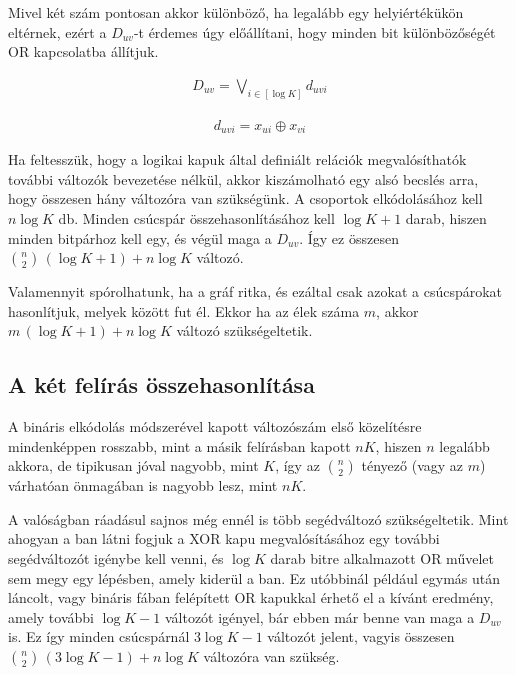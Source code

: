 Mivel két szám pontosan akkor különböző, ha legalább egy helyiértékükön eltérnek, ezért a $D_{uv}$-t érdemes úgy előállítani, hogy minden bit különbözőségét OR kapcsolatba állítjuk.

\begin{align}
	D_{uv} = \bigvee_{i \in [ \log K ] }{d_{uvi}}
\end{align}

\begin{align}
	d_{uvi} = x_{ui} \oplus x_{vi}
\end{align}

Ha feltesszük, hogy a logikai kapuk által definiált relációk megvalósíthatók további változók bevezetése nélkül, akkor kiszámolható egy alsó becslés arra, hogy összesen hány változóra van szükségünk. A csoportok elkódolásához kell $n \log K$ db. Minden csúcspár összehasonlításához kell $\log K + 1$ darab, hiszen minden bitpárhoz kell egy, és végül maga a $D_{uv}$. Így ez összesen $\binom{n}{2} \, ( \log K + 1 ) + n\log K$ változó.

Valamennyit spórolhatunk, ha a gráf ritka, és ezáltal csak azokat a csúcspárokat hasonlítjuk, melyek között fut él. Ekkor ha az élek száma $m$, akkor $m \, ( \log K + 1 ) + n\log K$ változó szükségeltetik.

\subsection{A két felírás összehasonlítása}\label{sec:theoryonehotVSbinary}

A bináris elkódolás módszerével kapott változószám első közelítésre mindenképpen rosszabb, mint a másik felírásban kapott $nK$, hiszen $n$ legalább akkora, de tipikusan jóval nagyobb, mint $K$, így az $\binom{n}{2}$ tényező (vagy az $m$) várhatóan önmagában is nagyobb lesz, mint $nK$.

A valóságban ráadásul sajnos még ennél is több segédváltozó szükségeltetik. Mint ahogyan a ban látni fogjuk a XOR kapu megvalósításához egy további segédváltozót igénybe kell venni, és $\log K$ darab bitre alkalmazott OR művelet sem megy egy lépésben, amely kiderül a ban. Ez utóbbinál például egymás után láncolt, vagy bináris fában felépített OR kapukkal érhető el a kívánt eredmény, amely további $\log K -1$ változót igényel, bár ebben már benne van maga a $D_{uv}$ is. Ez így minden csúcspárnál $3\log K - 1$ változót jelent, vagyis összesen $\binom{n}{2} \, (3\log K -  1 ) + n \log K$ változóra van szükség.
 
